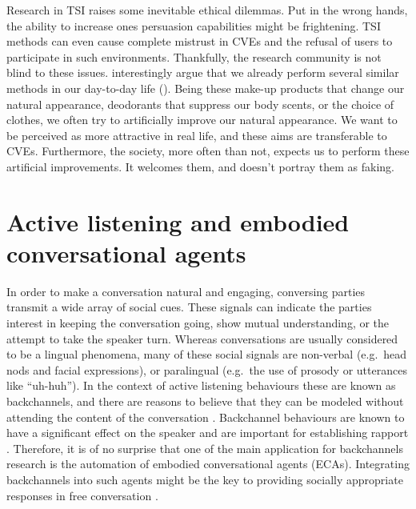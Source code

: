 \documentclass[]{simple-thesis}
\begin{document}
Research in TSI raises some inevitable ethical dilemmas.
Put in the wrong hands, the ability to increase ones persuasion capabilities might be frightening.
TSI methods can even cause complete mistrust in CVEs and the refusal of users to participate in such environments.
Thankfully, the research community is not blind to these issues.
\citeauthor{Bailenson2008} interestingly argue that we already perform several similar methods in our day-to-day life (\citeyear{Bailenson2008}).
Being these make-up products that change our natural appearance, deodorants that suppress our body scents, or the choice of clothes, we often try to artificially improve our natural appearance.
We want to be perceived as more attractive in real life, and these aims are transferable to CVEs.
Furthermore, the society, more often than not, expects us to perform these artificial improvements.
It welcomes them, and doesn't portray them as faking.

\section{Active listening and embodied conversational agents}

In order to make a conversation natural and engaging, conversing parties transmit a wide array of social cues.
These signals can indicate the parties interest in keeping the conversation going, show mutual understanding, or the attempt to take the speaker turn.
Whereas conversations are usually considered to be a lingual phenomena, many of these social signals are non-verbal (e.g.\ head nods and facial expressions), or paralingual (e.g.\ the use of prosody or utterances like ``uh-huh'').
In the context of active listening behaviours these are known as backchannels, and there are reasons to believe that they can be modeled without attending the content of the conversation \citep{Yngve1970}.
Backchannel behaviours are known to have a significant effect on the speaker \citep{Bavelas2000} and are important for establishing rapport \citep{Gratch2007}.
Therefore, it is of no surprise that one of the main application for backchannels research is the automation of embodied conversational agents (ECAs).
Integrating backchannels into such agents might be the key to providing socially appropriate responses in free conversation \citep{Morency2008, Bevacqua2008}.
\end{document}
